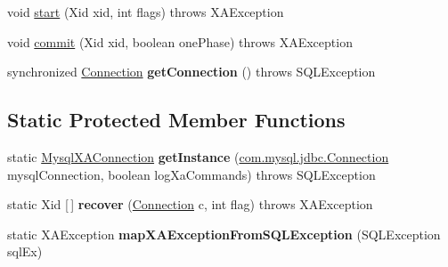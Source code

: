 \begin{DoxyCompactItemize}
\item 
void \mbox{\hyperlink{classcom_1_1mysql_1_1jdbc_1_1jdbc2_1_1optional_1_1_mysql_x_a_connection_a7c2af1d5be8d8ba54c6293c6e3e61ffd}{start}} (Xid xid, int flags)  throws X\+A\+Exception 
\item 
void \mbox{\hyperlink{classcom_1_1mysql_1_1jdbc_1_1jdbc2_1_1optional_1_1_mysql_x_a_connection_a0e248ebae4b509b14237febcd79c7132}{commit}} (Xid xid, boolean one\+Phase)  throws X\+A\+Exception 
\item 
\mbox{\label{classcom_1_1mysql_1_1jdbc_1_1jdbc2_1_1optional_1_1_mysql_x_a_connection_a16279181f48314c235a8edbc3452abf3}} 
synchronized \mbox{\hyperlink{interfacecom_1_1mysql_1_1jdbc_1_1_connection}{Connection}} {\bfseries get\+Connection} ()  throws S\+Q\+L\+Exception 
\end{DoxyCompactItemize}
\subsection*{Static Protected Member Functions}
\begin{DoxyCompactItemize}
\item 
\mbox{\label{classcom_1_1mysql_1_1jdbc_1_1jdbc2_1_1optional_1_1_mysql_x_a_connection_ac1d453a2ff5d3af2b96bc50a61c5cab4}} 
static \mbox{\hyperlink{classcom_1_1mysql_1_1jdbc_1_1jdbc2_1_1optional_1_1_mysql_x_a_connection}{Mysql\+X\+A\+Connection}} {\bfseries get\+Instance} (\mbox{\hyperlink{interfacecom_1_1mysql_1_1jdbc_1_1_connection}{com.\+mysql.\+jdbc.\+Connection}} mysql\+Connection, boolean log\+Xa\+Commands)  throws S\+Q\+L\+Exception 
\item 
\mbox{\label{classcom_1_1mysql_1_1jdbc_1_1jdbc2_1_1optional_1_1_mysql_x_a_connection_ac5e2ace16b8a6812130dd22538d82aaa}} 
static Xid \mbox{[}$\,$\mbox{]} {\bfseries recover} (\mbox{\hyperlink{interfacecom_1_1mysql_1_1jdbc_1_1_connection}{Connection}} c, int flag)  throws X\+A\+Exception 
\item 
\mbox{\label{classcom_1_1mysql_1_1jdbc_1_1jdbc2_1_1optional_1_1_mysql_x_a_connection_a71761d33388941ae85f7f8739fe6fce1}} 
static X\+A\+Exception {\bfseries map\+X\+A\+Exception\+From\+S\+Q\+L\+Exception} (S\+Q\+L\+Exception sql\+Ex)
\end{DoxyCompactItemize}
